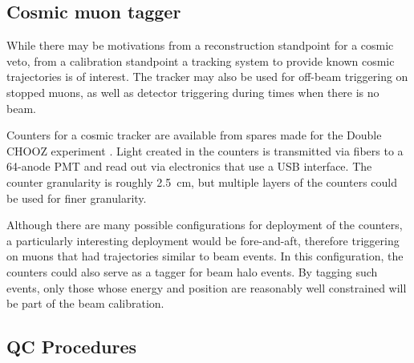 

\subsection{Cosmic muon tagger}
\label{muontagger}

        While there may be motivations from a reconstruction standpoint for a
cosmic veto, from a calibration standpoint a tracking system to provide known 
cosmic trajectories is of interest. The tracker may also be used for
off-beam triggering on stopped muons, as well as detector triggering during
times when there is no beam.

        Counters for a cosmic tracker are available from spares made for the
Double CHOOZ experiment \cite{mucounters}. Light created in the
counters is transmitted via fibers to a 64-anode PMT and read out via
electronics that use a USB interface.  The counter granularity is roughly 2.5~cm, but
multiple layers of the counters could be used for finer granularity.


        Although there are many possible configurations for deployment of the
counters, a particularly interesting deployment would be fore-and-aft,
therefore triggering on muons that had trajectories similar to beam events. In
this configuration, the counters could also serve as a tagger for beam halo
events.  By tagging such events, only those whose energy and position are
reasonably well constrained will be part of the beam calibration.





\subsection{QC Procedures}

